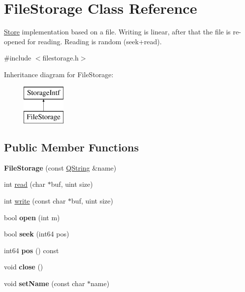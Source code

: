 \hypertarget{class_file_storage}{}\section{File\+Storage Class Reference}
\label{class_file_storage}


\mbox{\hyperlink{class_store}{Store}} implementation based on a file. Writing is linear, after that the file is re-\/opened for reading. Reading is random (seek+read).  




{\ttfamily \#include $<$filestorage.\+h$>$}

Inheritance diagram for File\+Storage\+:\begin{figure}[H]
\begin{center}
\leavevmode
\includegraphics[height=2.000000cm]{class_file_storage}
\end{center}
\end{figure}
\subsection*{Public Member Functions}
\begin{DoxyCompactItemize}
\item 
\mbox{\label{class_file_storage_afa4f6304190c22b38d504402aeeb8d12}} 
{\bfseries File\+Storage} (const \mbox{\hyperlink{class_q_string}{Q\+String}} \&name)
\item 
int \mbox{\hyperlink{class_file_storage_ae28163449c4c40730b5e27b75362e22d}{read}} (char $\ast$buf, uint size)
\item 
int \mbox{\hyperlink{class_file_storage_a9f680051229bda7bca2639e5464bca77}{write}} (const char $\ast$buf, uint size)
\item 
\mbox{\label{class_file_storage_ae033a7582c81d34ce0dba7e3b9e261a4}} 
bool {\bfseries open} (int m)
\item 
\mbox{\label{class_file_storage_a1eccec51152846d9793e81abe6be2f3d}} 
bool {\bfseries seek} (int64 pos)
\item 
\mbox{\label{class_file_storage_ac456cdf8bc3ba28d8fd6c8b7105708c4}} 
int64 {\bfseries pos} () const
\item 
\mbox{\label{class_file_storage_a117ef83c02af566b40f58d9e7c93dbfd}} 
void {\bfseries close} ()
\item 
\mbox{\label{class_file_storage_a34fae2b5ed8a461f14648784058098e2}} 
void {\bfseries set\+Name} (const char $\ast$name)
\end{DoxyCompactItemize}


